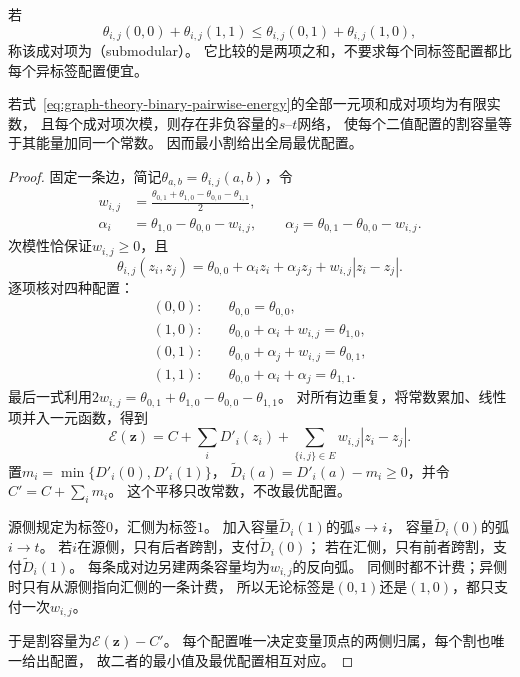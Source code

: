 若
\begin{equation}
  \theta_{i,j}(0,0)+\theta_{i,j}(1,1)
  \leq\theta_{i,j}(0,1)+\theta_{i,j}(1,0),
  \label{eq:graph-theory-pairwise-submodularity}
\end{equation}
称该成对项为（submodular）。
它比较的是两项之和，不要求每个同标签配置都比每个异标签配置便宜。

\begin{theorem}[二值次模成对能量的割表示]
  \label{thm:graph-theory-submodular-cut-representation}
  若式~\eqref{eq:graph-theory-binary-pairwise-energy}的全部一元项和成对项均为有限实数，
  且每个成对项次模，则存在非负容量的\(s\)--\(t\)网络，
  使每个二值配置的割容量等于其能量加同一个常数。
  因而最小割给出全局最优配置。
\end{theorem}

\begin{proof}
固定一条边，简记\(\theta_{a,b}=\theta_{i,j}(a,b)\)，令
\begin{align}
  w_{i,j}
  &=\frac{\theta_{0,1}+\theta_{1,0}-\theta_{0,0}-\theta_{1,1}}2,
  \label{eq:graph-theory-cut-pair-weight}\\
  \alpha_i&=\theta_{1,0}-\theta_{0,0}-w_{i,j},\qquad
  \alpha_j=\theta_{0,1}-\theta_{0,0}-w_{i,j}.
  \label{eq:graph-theory-cut-unary-shifts}
\end{align}
次模性恰保证\(w_{i,j}\geq0\)，且
\begin{equation}
  \theta_{i,j}(z_i,z_j)=\theta_{0,0}+\alpha_i z_i+\alpha_j z_j
  +w_{i,j}|z_i-z_j|.
  \label{eq:graph-theory-pairwise-cut-decomposition}
\end{equation}
逐项核对四种配置：
\begin{align*}
  (0,0):\quad&\theta_{0,0}=\theta_{0,0},\\
  (1,0):\quad&\theta_{0,0}+\alpha_i+w_{i,j}=\theta_{1,0},\\
  (0,1):\quad&\theta_{0,0}+\alpha_j+w_{i,j}=\theta_{0,1},\\
  (1,1):\quad&\theta_{0,0}+\alpha_i+\alpha_j=\theta_{1,1}.
\end{align*}
最后一式利用\(2w_{i,j}=\theta_{0,1}+\theta_{1,0}-\theta_{0,0}-\theta_{1,1}\)。
对所有边重复，将常数累加、线性项并入一元函数，得到
\[
  \mathcal E(\bm z)=C+\sum_iD'_i(z_i)
    +\sum_{\{i,j\}\in E}w_{i,j}|z_i-z_j|.
\]
置\(m_i=\min\{D'_i(0),D'_i(1)\}\)，
\(\widetilde D_i(a)=D'_i(a)-m_i\geq0\)，并令\(C'=C+\sum_i m_i\)。
这个平移只改常数，不改最优配置。

源侧规定为标签\(0\)，汇侧为标签\(1\)。
加入容量\(\widetilde D_i(1)\)的弧\(s\to i\)，
容量\(\widetilde D_i(0)\)的弧\(i\to t\)。
若\(i\)在源侧，只有后者跨割，支付\(\widetilde D_i(0)\)；
若在汇侧，只有前者跨割，支付\(\widetilde D_i(1)\)。
每条成对边另建两条容量均为\(w_{i,j}\)的反向弧。
同侧时都不计费；异侧时只有从源侧指向汇侧的一条计费，
所以无论标签是\((0,1)\)还是\((1,0)\)，都只支付一次\(w_{i,j}\)。

于是割容量为\(\mathcal E(\bm z)-C'\)。
每个配置唯一决定变量顶点的两侧归属，每个割也唯一给出配置，
故二者的最小值及最优配置相互对应。
\end{proof}

